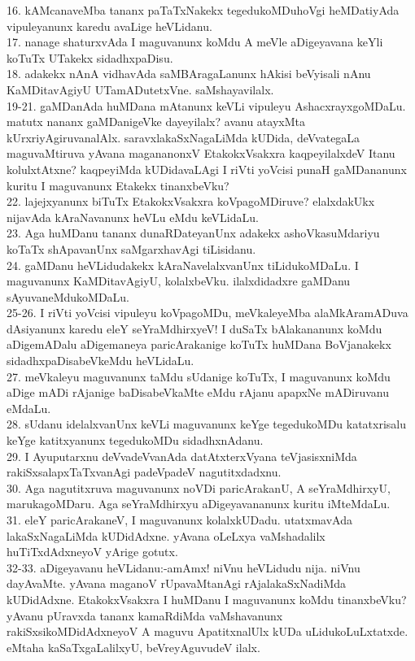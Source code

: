 \documentclass{article}
\begin{document}
16. kAMcanaveMba tananx paTaTxNakekx tegedukoMDuhoVgi heMDatiyAda vipuleyanunx karedu avaLige heVLidanu.\\
17. nanage shaturxvAda I maguvanunx koMdu A meVle aDigeyavana keYli koTuTx UTakekx sidadhxpaDisu.\\
18. adakekx nAnA vidhavAda saMBAragaLanunx hAkisi beVyisali nAnu KaMDitavAgiyU UTamADutetxVne. saMshayavilalx.\\
19-21. gaMDanAda huMDana mAtanunx keVLi vipuleyu AshacxrayxgoMDaLu. matutx nananx gaMDanigeVke dayeyilalx? avanu atayxMta kUrxriyAgiruvanalAlx. saravxlakaSxNagaLiMda kUDida, deVvategaLa maguvaMtiruva yAvana magananonxV EtakokxVsakxra kaqpeyilalxdeV Itanu kolulxtAtxne? kaqpeyiMda kUDidavaLAgi I riVti yoVcisi punaH gaMDananunx kuritu I maguvanunx Etakekx tinanxbeVku?\\
22. lajejxyanunx biTuTx EtakokxVsakxra koVpagoMDiruve? elalxdakUkx nijavAda kAraNavanunx heVLu eMdu keVLidaLu.\\
23. Aga huMDanu tananx dunaRDateyanUnx adakekx ashoVkasuMdariyu koTaTx shApavanUnx saMgarxhavAgi tiLisidanu.\\
24. gaMDanu heVLidudakekx kAraNavelalxvanUnx tiLidukoMDaLu. I maguvanunx KaMDitavAgiyU, kolalxbeVku. ilalxdidadxre gaMDanu sAyuvaneMdukoMDaLu.\\
25-26. I riVti yoVcisi vipuleyu koVpagoMDu, meVkaleyeMba alaMkAramADuva dAsiyanunx karedu eleY seYraMdhirxyeV! I duSaTx bAlakananunx koMdu aDigemADalu aDigemaneya paricArakanige koTuTx huMDana BoVjanakekx sidadhxpaDisabeVkeMdu heVLidaLu.\\
27. meVkaleyu maguvanunx taMdu sUdanige koTuTx, I maguvanunx koMdu aDige mADi rAjanige baDisabeVkaMte eMdu rAjanu apapxNe mADiruvanu eMdaLu.\\
28. sUdanu idelalxvanUnx keVLi maguvanunx keYge tegedukoMDu katatxrisalu keYge katitxyanunx tegedukoMDu sidadhxnAdanu.\\
29. I Ayuputarxnu deVvadeVvanAda datAtxterxVyana teVjasisxniMda rakiSxsalapxTaTxvanAgi padeVpadeV nagutitxdadxnu.\\
30. Aga nagutitxruva maguvanunx noVDi paricArakanU, A seYraMdhirxyU, marukagoMDaru. Aga seYraMdhirxyu aDigeyavananunx kuritu iMteMdaLu.\\
31. eleY paricArakaneV, I maguvanunx kolalxkUDadu. utatxmavAda lakaSxNagaLiMda kUDidAdxne. yAvana oLeLxya vaMshadalilx huTiTxdAdxneyoV yArige gotutx.\\
32-33. aDigeyavanu heVLidanu:-amAmx! niVnu heVLidudu nija. niVnu dayAvaMte. yAvana maganoV rUpavaMtanAgi rAjalakaSxNadiMda kUDidAdxne. EtakokxVsakxra I huMDanu I maguvanunx koMdu tinanxbeVku? yAvanu pUravxda tananx kamaRdiMda vaMshavanunx rakiSxsikoMDidAdxneyoV A maguvu ApatitxnalUlx kUDa uLidukoLuLxtatxde. eMtaha kaSaTxgaLalilxyU, beVreyAguvudeV ilalx.\\
\end{document}
